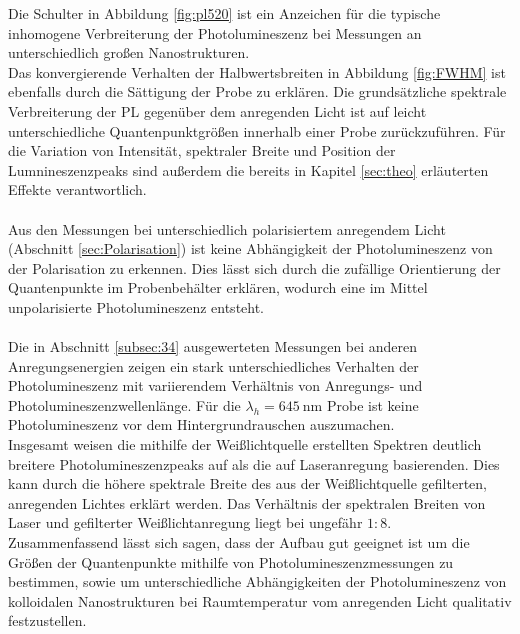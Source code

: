 Die Schulter in Abbildung \ref{fig:pl520} ist ein Anzeichen für die typische inhomogene Verbreiterung der Photolumineszenz bei Messungen an unterschiedlich großen Nanostrukturen.\\
Das konvergierende Verhalten der Halbwertsbreiten in Abbildung \ref{fig:FWHM} ist ebenfalls durch
die Sättigung der Probe zu erklären. Die grundsätzliche spektrale Verbreiterung der PL
gegenüber dem anregenden Licht ist auf leicht unterschiedliche Quantenpunktgrößen
innerhalb einer Probe zurückzuführen. Für die Variation von Intensität,
spektraler Breite und Position der Lumnineszenzpeaks sind außerdem die
bereits in Kapitel \ref{sec:theo} erläuterten Effekte verantwortlich. \\
\\
Aus den Messungen bei unterschiedlich polarisiertem anregendem Licht
(Abschnitt \ref{sec:Polarisation}) ist keine Abhängigkeit der Photolumineszenz
von der Polarisation zu erkennen. Dies lässt sich durch die zufällige Orientierung
der Quantenpunkte im Probenbehälter erklären, wodurch eine im Mittel unpolarisierte Photolumineszenz entsteht.\\
\\
Die in Abschnitt \ref{subsec:34} ausgewerteten Messungen bei anderen Anregungsenergien
zeigen ein stark unterschiedliches Verhalten der Photolumineszenz
mit variierendem Verhältnis von Anregungs- und Photolumineszenzwellenlänge.
Für die $\lambda_h = \SI{645}{\nano\meter}$ Probe ist keine Photolumineszenz
vor dem Hintergrundrauschen auszumachen. \\
Insgesamt weisen die mithilfe der Weißlichtquelle erstellten Spektren deutlich breitere
Photolumineszenzpeaks auf als die auf Laseranregung basierenden. Dies kann durch die
höhere spektrale Breite des aus der Weißlichtquelle gefilterten, anregenden Lichtes erklärt werden. Das Verhältnis der spektralen Breiten von Laser und gefilterter Weißlichtanregung liegt bei ungefähr $1:8$. \\

Zusammenfassend lässt sich sagen, dass der Aufbau gut geeignet ist um die Größen der
Quantenpunkte mithilfe von Photolumineszenzmessungen zu bestimmen, sowie um unterschiedliche
Abhängigkeiten der Photolumineszenz von kolloidalen Nanostrukturen bei Raumtemperatur vom anregenden Licht qualitativ festzustellen.
%
%

